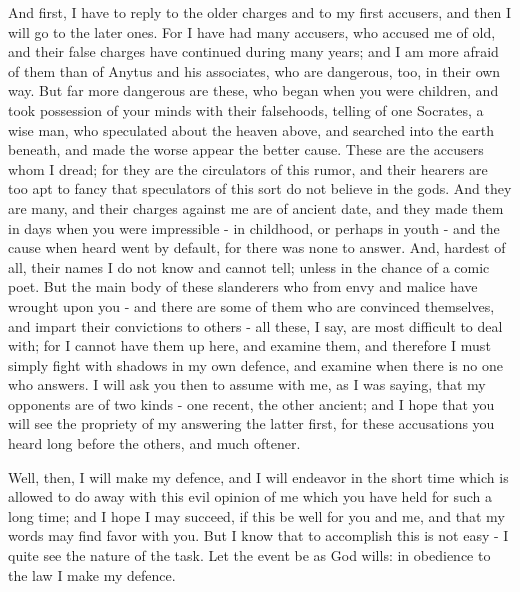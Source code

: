 \documentclass[11pt]{article}
\begin{document}
And first, I have to reply to the older charges and to my first accusers, and then I will go to the later ones. For I have had many accusers, who accused me of old, and their false charges have continued during many years; and I am more afraid of them than of Anytus and his associates, who are dangerous, too, in their own way. But far more dangerous are these, who began when you were children, and took possession of your minds with their falsehoods, telling of one Socrates, a wise man, who speculated about the heaven above, and searched into the earth beneath, and made the worse appear the better cause. These are the accusers whom I dread; for they are the circulators of this rumor, and their hearers are too apt to fancy that speculators of this sort do not believe in the gods. And they are many, and their charges against me are of ancient date, and they made them in days when you were impressible - in childhood, or perhaps in youth - and the cause when heard went by default, for there was none to answer. And, hardest of all, their names I do not know and cannot tell; unless in the chance of a comic poet. But the main body of these slanderers who from envy and malice have wrought upon you - and there are some of them who are convinced themselves, and impart their convictions to others - all these, I say, are most difficult to deal with; for I cannot have them up here, and examine them, and therefore I must simply fight with shadows in my own defence, and examine when there is no one who answers. I will ask you then to assume with me, as I was saying, that my opponents are of two kinds - one recent, the other ancient; and I hope that you will see the propriety of my answering the latter first, for these accusations you heard long before the others, and much oftener.

Well, then, I will make my defence, and I will endeavor in the short time which is allowed to do away with this evil opinion of me which you have held for such a long time; and I hope I may succeed, if this be well for you and me, and that my words may find favor with you. But I know that to accomplish this is not easy - I quite see the nature of the task. Let the event be as God wills: in obedience to the law I make my defence.
\end{document}
